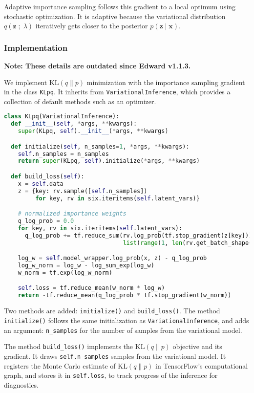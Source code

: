 Adaptive importance sampling follows this gradient to a local optimum using
stochastic optimization. It is adaptive because the variational distribution
$q(\mathbf{z}\;;\;\lambda)$ iteratively gets closer to the posterior $p(\mathbf{z} \mid \mathbf{x})$.

\subsubsection{Implementation}

\textbf{Note: These details are outdated since Edward v1.1.3.}

We implement $\text{KL}(q\|p)$ minimization with the importance
sampling gradient in the class \texttt{KLpq}. It inherits from
\texttt{VariationalInference}, which provides a collection of default
methods such as an optimizer.

\begin{lstlisting}[language=Python]
class KLpq(VariationalInference):
  def __init__(self, *args, **kwargs):
    super(KLpq, self).__init__(*args, **kwargs)

  def initialize(self, n_samples=1, *args, **kwargs):
    self.n_samples = n_samples
    return super(KLpq, self).initialize(*args, **kwargs)

  def build_loss(self):
    x = self.data
    z = {key: rv.sample([self.n_samples])
         for key, rv in six.iteritems(self.latent_vars)}

    # normalized importance weights
    q_log_prob = 0.0
    for key, rv in six.iteritems(self.latent_vars):
      q_log_prob += tf.reduce_sum(rv.log_prob(tf.stop_gradient(z[key])),
                                  list(range(1, len(rv.get_batch_shape()) + 1)))

    log_w = self.model_wrapper.log_prob(x, z) - q_log_prob
    log_w_norm = log_w - log_sum_exp(log_w)
    w_norm = tf.exp(log_w_norm)

    self.loss = tf.reduce_mean(w_norm * log_w)
    return -tf.reduce_mean(q_log_prob * tf.stop_gradient(w_norm))
\end{lstlisting}

Two methods are added: \texttt{initialize()} and
\texttt{build_loss()}. The method \texttt{initialize()}
follows the same initialization as \texttt{VariationalInference}, and
adds an argument: \texttt{n_samples} for the number of samples from
the variational model.

The method \texttt{build_loss()} implements the $\text{KL}(q\|p)$
objective and its gradient. It draws \texttt{self.n_samples} samples from the
variational model. It registers the Monte Carlo
estimate of $\text{KL}(q\|p)$ in TensorFlow's computational graph, and stores it
in \texttt{self.loss}, to track progress of the inference for diagnostics.

